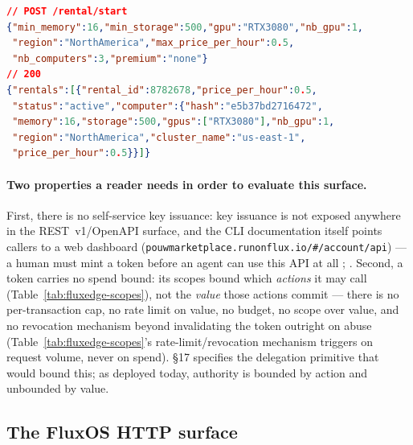 \begin{lstlisting}[caption={A criteria-based rental request and its response. The token that
issues this call is scoped to \texttt{start\_rental} (Table~\ref{tab:fluxedge-scopes}) but
carries no bound on \texttt{max\_price\_per\_hour} or \texttt{nb\_computers} beyond what the
caller writes into the request body.}, label=lst:fluxedge-rental-schema, language=json,
basicstyle=\footnotesize\ttfamily]
// POST /rental/start
{"min_memory":16,"min_storage":500,"gpu":"RTX3080","nb_gpu":1,
 "region":"NorthAmerica","max_price_per_hour":0.5,
 "nb_computers":3,"premium":"none"}
// 200
{"rentals":[{"rental_id":8782678,"price_per_hour":0.5,
 "status":"active","computer":{"hash":"e5b37bd2716472",
 "memory":16,"storage":500,"gpus":["RTX3080"],"nb_gpu":1,
 "region":"NorthAmerica","cluster_name":"us-east-1",
 "price_per_hour":0.5}}]}
\end{lstlisting}

\paragraph{Two properties a reader needs in order to evaluate this surface.} First, there is
no self-service key issuance: key issuance is not exposed anywhere in the REST~v1/OpenAPI
surface, and the CLI documentation itself points callers to a web dashboard
(\texttt{pouwmarketplace.runonflux.io/\#/account/api}) — a human must mint a token before an
agent can use this API at all ;
. Second, a token carries no spend
bound: its scopes bound which \emph{actions} it may call (Table~\ref{tab:fluxedge-scopes}),
not the \emph{value} those actions commit — there is no per-transaction cap, no rate limit
on value, no budget, no scope over value, and no revocation mechanism beyond invalidating
the token outright on abuse (Table~\ref{tab:fluxedge-scopes}'s rate-limit/revocation
mechanism triggers on request volume, never on spend). \S17 specifies the delegation
primitive that would bound this; as deployed today, authority is bounded by action and
unbounded by value.

\subsection{The FluxOS HTTP surface}
\shipped


